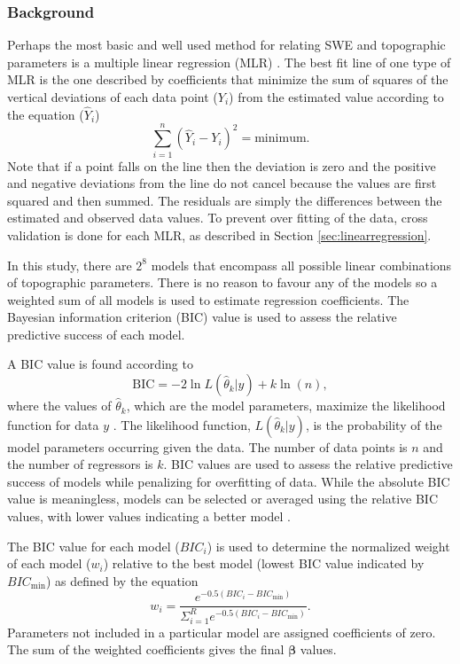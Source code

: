 \documentclass{sfuthesis}
\begin{document}
\subsubsection{Background}

Perhaps the most basic and well used method for relating SWE and topographic parameters is a multiple linear regression (MLR) \citep[e.g.][]{Cohen2013}. The best fit line of one type of MLR is the one described by coefficients that minimize the sum of squares of the vertical deviations of each data point ($Y_i$) from the estimated value according to the equation ($\hat{Y}_i$) \citep{Davis1986}
\begin{equation}
\sum^n_{i=1}(\hat{Y}_i-Y_i)^2 = \mathrm{minimum}.
\end{equation}
Note that if a point falls on the line then the deviation is zero and  the positive and negative deviations from the line do not cancel because the values are first squared and then summed. The residuals are simply the differences between the estimated and observed data values. To prevent over fitting of the data, cross validation is done for each MLR, as described in Section \ref{sec:linearregression}.

In this study, there are $2^8$ models that encompass all possible linear combinations of topographic parameters. There is no reason to favour any of the models so a weighted sum of all models is used to estimate regression coefficients. The Bayesian information criterion (BIC) value is used to assess the relative predictive success of each model. 

A BIC value is found according to
\begin{equation}
\textrm{BIC} = -2 \ln L(\hat\theta_k  | y) + k \ln(n),
\end{equation}
where the values of $\hat \theta_k$, which are the model parameters, maximize the likelihood function for data $y$ \citep{Burnham2004}. The likelihood function, $ L(\hat\theta_k  | y)$, is the probability of the model parameters occurring given the data. The number of data points is $n$ and the number of regressors is $k$. BIC values are used to assess the relative predictive success of models while penalizing for overfitting of data. While the absolute BIC value is meaningless, models can be selected or averaged using the relative BIC values, with lower values indicating a better model \citep{Burnham2004}. 

The BIC value for each model ($BIC_i$) is used to determine the normalized weight of each model ($w_i$) relative to the best model (lowest BIC value indicated by $BIC_{\min}$) as defined by the equation \citep{Burnham2004}
\begin{equation}
w_i = \frac{e^{-0.5(BIC_i-BIC_{\min})}}{\Sigma_{i=1}^R e^{-0.5(BIC_i-BIC_{\min})}}.
\label{eq:BIC}
\end{equation}
Parameters not included in a particular model are assigned coefficients of zero. The sum of the weighted coefficients gives the final $\bm{\beta}$ values.
\end{document}
